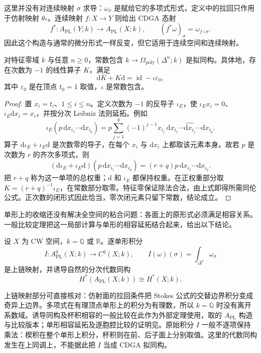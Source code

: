 这里并没有对连续映射 \(\sigma\) 求导：\(\omega_\sigma\) 是赋给它的多项式形式，定义中的拉回只作用于仿射映射 \(\theta_*\)。连续映射 \(f:X\to Y\) 则给出 CDGA 态射
\[
	f^*:A_{\mathrm{PL}}(Y;k)\longrightarrow A_{\mathrm{PL}}(X;k),\qquad
	(f^*\omega)_\sigma=\omega_{f\circ\sigma}.
\]
因此这个构造与通常的微分形式一样反变，但它适用于连续空间和连续映射。

\begin{proposition}\label{g2:prop:polynomial-poincare}
	对特征零域 \(k\) 与任意 \(n\geq0\)，常数包含 \(k\to\Omega_{\mathrm{poly}}(\Delta^n;k)\) 是拟同构。具体地，存在次数为 \(-1\) 的线性算子 \(K\)，满足
	\[
		\mathrm dK+K\mathrm d=\operatorname{id}-\iota\varepsilon_0,
	\]
	其中 \(\varepsilon_0\) 是在顶点 \(t_0=1\) 取值，\(\iota\) 是常数包含。
\end{proposition}
\begin{proof}
	置 \(x_i=t_i\)、\(1\leq i\leq n\)。定义次数为 \(-1\) 的反导子 \(\iota_E\)，使 \(\iota_E x_i=0\)、\(\iota_E\mathrm dx_i=x_i\)，并按分次 Leibniz 法则延拓。例如
	\[
		\iota_E(p\,\mathrm dx_{i_1}\cdots\mathrm dx_{i_q})
		=p\sum_{j=1}^q(-1)^{j-1}x_{i_j}\,\mathrm dx_{i_1}\cdots\widehat{\mathrm dx_{i_j}}\cdots\mathrm dx_{i_q}.
	\]
	算子 \(\mathrm d\iota_E+\iota_E\mathrm d\) 是次数零的导子，在每个 \(x_i\) 与 \(\mathrm dx_i\) 上都取该元素本身。故若 \(p\) 是次数为 \(r\) 的齐次多项式，则
	\[
		(\mathrm d\iota_E+\iota_E\mathrm d)(p\,\mathrm dx_{i_1}\cdots\mathrm dx_{i_q})
		=(r+q)p\,\mathrm dx_{i_1}\cdots\mathrm dx_{i_q}.
	\]
	把 \(r+q\) 称为这一单项的总权重；\(\mathrm d\) 和 \(\iota_E\) 都保持权重。在正权重部分取 \(K=(r+q)^{-1}\iota_E\)，在常数部分取零。特征零保证除法合法，由上式即得所需同伦公式。正次数的闭形式因此恰当，零次闭元素只留下常数，结论成立。
\end{proof}

单形上的收缩还没有解决全空间的粘合问题：各面上的原形式必须满足相容关系。一般比较定理把这一局部计算与单形的相容延拓结合起来，给出以下结论。

\begin{theorem}\label{g2:thm:pl-de-rham-comparison}
	设 \(X\) 为 CW 空间，\(k=\mathbb Q\) 或 \(\mathbb R\)。逐单形积分
	\[
		I:A_{\mathrm{PL}}^q(X;k)\longrightarrow C^q(X;k),\qquad
		I(\omega)(\sigma)=\int_{\Delta^q}\omega_\sigma
	\]
	是上链映射，并诱导自然的分次代数同构
	\[
		H^*(A_{\mathrm{PL}}(X;k))\cong H^*(X;k).
	\]
\end{theorem}

上链映射部分可直接核对：仿射面的拉回条件把 Stokes 公式的交替边界积分变成奇异上边界。多项式在有理顶点单形上的积分为有理数，所以 \(k=\mathbb Q\) 时没有离开系数域。诱导同构及杯积相容的一般比较在此作为外部定理使用，取\cite[第2节，第15—17页]{FelixHalperin2017SullivanModels}的 \(A_{\mathrm{PL}}\) 构造与比较版本；单形相容延拓及逐胞腔比较的证明见\cite[第7节，定理7.1及其后的多项式形式、半单纯复形例子，第297—299页]{Sullivan1977Infinitesimal}。原始积分 \(I\) 一般不逐项保持乘法：楔积在整个单形上积分，杯积则在前、后子面上分别取值。这里的代数同构发生在上同调上，不能据此把 \(I\) 当成 CDGA 拟同构。

